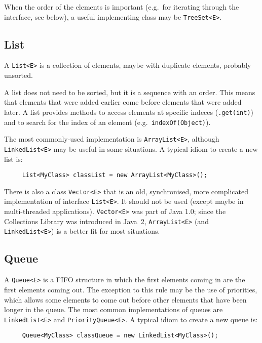 When the order of the elements is important (e.g.~for iterating
through the interface, see below), a useful implementing class may be
\verb+TreeSet<E>+. 

\subsection{List}
\label{sec:lists}

A \verb+List<E>+ is a collection of elements, maybe with duplicate
elements, probably unsorted.

A list does not need to be sorted, but it is a sequence with an
order. This means that elements that were added earlier come before
elements that were added later. A list provides methods to access
elements at specific indeces (\verb+.get(int)+) and to search for
the index of an element (e.g.~\verb+indexOf(Object)+). 

The most commonly-used implementation is \verb+ArrayList<E>+, although
\verb+LinkedList<E>+ may be useful in some situations. A typical idiom to
create a new list is:

\begin{verbatim}
     List<MyClass> classList = new ArrayList<MyClass>();
\end{verbatim}

There is also a
class \verb+Vector<E>+ that is an old, synchronised, more complicated
implementation of interface \verb+List<E>+. It should not be
used (except maybe in multi-threaded applications). \verb+Vector<E>+ was
part of Java 1.0; since the Collections Library was introduced in
Java~2, \verb+ArrayList<E>+ (and \verb+LinkedList<E>+)
is a better fit for most situations. 

\subsection{Queue}
\label{sec:queue}

A \verb+Queue<E>+ is a FIFO structure in which the first elements coming
in are the first elements coming out. The exception to this rule may
be the use of priorities, which allows some elements to come out
before other elements that have been longer in the queue. The most
common implementations of queues are \verb+LinkedList<E>+ and
\verb+PriorityQueue<E>+. A typical idiom to
create a new queue is:

\begin{verbatim}
     Queue<MyClass> classQueue = new LinkedList<MyClass>();
\end{verbatim}

